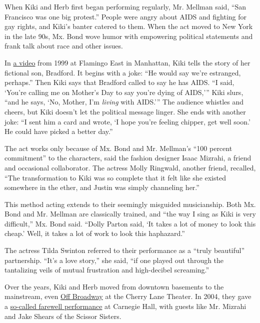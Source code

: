 When Kiki and Herb first began performing regularly, Mr. Mellman said,
``San Francisco was one big protest.'' People were angry about AIDS and
fighting for gay rights, and Kiki's banter catered to them. When the act
moved to New York in the late 90s, Mx. Bond wove humor with empowering
political statements and frank talk about race and other issues.

In \href{https://www.youtube.com/watch?v=LXrDCMb6HtA}{a video} from 1999
at Flamingo East in Manhattan, Kiki tells the story of her fictional
son, Bradford. It begins with a joke: ``He would say we're estranged,
perhaps.'' Then Kiki says that Bradford called to say he has AIDS. ``I
said, `You're calling me on Mother's Day to say you're dying of AIDS,'''
Kiki slurs, ``and he says, `No, Mother, I'm \emph{living} with AIDS.'''
The audience whistles and cheers, but Kiki doesn't let the political
message linger. She ends with another joke: ``I sent him a card and
wrote, `I hope you're feeling chipper, get well soon.' He could have
picked a better day.''

The act works only because of Mx. Bond and Mr. Mellman's ``100 percent
commitment'' to the characters, said the fashion designer Isaac Mizrahi,
a friend and occasional collaborator. The actress Molly Ringwald,
another friend, recalled, ``The transformation to Kiki was so complete
that it felt like she existed somewhere in the ether, and Justin was
simply channeling her.''

This method acting extends to their seemingly misguided musicianship.
Both Mx. Bond and Mr. Mellman are classically trained, and ``the way I
sing as Kiki is very difficult,'' Mx. Bond said. ``Dolly Parton said,
`It takes a lot of money to look this cheap.' Well, it takes a lot of
work to look this haphazard.''

The actress Tilda Swinton referred to their performance as a ``truly
beautiful'' partnership. ``It's a love story,'' she said, ``if one
played out through the tantalizing veils of mutual frustration and
high-decibel screaming.''

Over the years, Kiki and Herb moved from downtown basements to the
mainstream, even
\href{http://www.nytimes3xbfgragh.onion/2003/05/25/theater/theater-excerpt-kiki-herb-coup-de-theatre.html}{Off
Broadway} at the Cherry Lane Theater. In 2004, they gave a
\href{http://www.nytimes3xbfgragh.onion/2004/09/18/arts/music/swan-songs-as-a-duo-plan-lifes-second-act.html}{so-called
farewell performance} at Carnegie Hall, with guests like Mr. Mizrahi and
Jake Shears of the Scissor Sisters.

